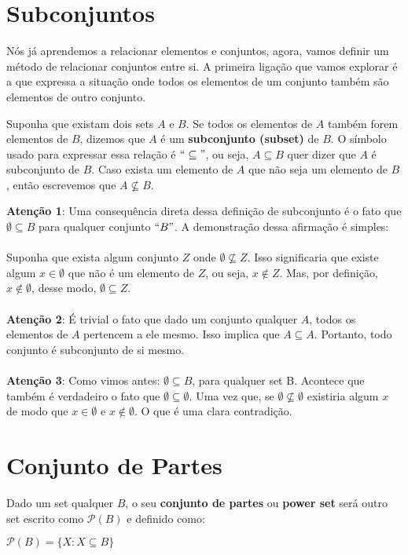 \documentclass[main.tex]{subfiles}
\begin{document}
\section{Subconjuntos}

Nós já aprendemos a relacionar elementos e conjuntos, agora, vamos definir um método de relacionar conjuntos entre si. A primeira ligação que vamos explorar é a que expressa a situação onde todos os elementos de um conjunto também são elementos de outro conjunto.

\begin{definition}[Subconjunto]
Suponha que existam dois sets $A$ e $B$. Se todos os elementos de $A$ também forem elementos de $B$, dizemos que $A$ é um \textbf{subconjunto (subset)} de $B$. O símbolo usado para expressar essa relação é $``\subseteq"$, ou seja, $A \subseteq B$ quer dizer que $A$ é subconjunto de $B$. Caso exista um elemento de $A$ que não seja um elemento de $B$, então escrevemos que $A \nsubseteq B$.
\end{definition}

\textbf{Atenção 1}: Uma consequência direta dessa definição de subconjunto é o fato que $\emptyset \subseteq B$ para qualquer conjunto $``B"$. A demonstração dessa afirmação é simples:
\\~\\
Suponha que exista algum conjunto $Z$ onde $\emptyset \nsubseteq Z$. Isso significaria que existe algum $x \in \emptyset$ que não é um elemento de $Z$, ou seja, $x \notin Z$. Mas, por definição, $x \notin \emptyset$, desse modo, $\emptyset \subseteq Z$.
\\~\\
\textbf{Atenção 2}: É trivial o fato que dado um conjunto qualquer $A$, todos os elementos de $A$ pertencem a ele mesmo. Isso implica que $A \subseteq A$. Portanto, todo conjunto é subconjunto de si mesmo.
\\~\\
\textbf{Atenção 3}: Como vimos antes: $\emptyset \subseteq B$, para qualquer set B. Acontece que também é verdadeiro o fato que $\emptyset \subseteq \emptyset$. Uma vez que, se $\emptyset \nsubseteq \emptyset$ existiria algum $x$ de modo que $x \in \emptyset$ e $x \notin \emptyset$. O que é uma clara contradição.

\section{Conjunto de Partes}

\begin{definition}
Dado um set qualquer $B$, o seu \textbf{conjunto de partes} ou \textbf{power set} será outro set escrito como $\mathscr{P}(B)$ e definido como:
\begin{center}
	$\mathscr{P}(B) = \{ X : X \subseteq B \}$
\end{center}
\end{definition}
\end{document}
